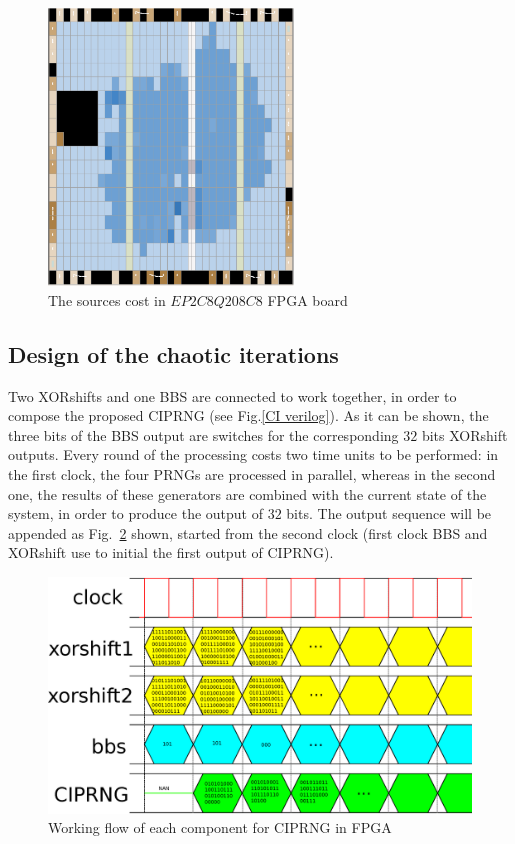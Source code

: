 \begin{figure}
\begin{center}
  \includegraphics[width=6.5cm]{print.eps}
\end{center}
\caption{The sources cost in $EP2C8Q208C8$ FPGA board}
 \label{logic elements}
\end{figure}

\subsection{Design of the chaotic iterations}
Two XORshifts and one BBS are connected to work together, in order to compose the
proposed CIPRNG (see Fig.\ref{CI verilog}). 
As it can be shown, the three bits of the BBS output are switches for the corresponding $32$ bits XORshift outputs. Every round of the 
 processing costs two time units
 to be performed: in the first clock, 
the four PRNGs are processed in parallel,
whereas in the second one, the results of these generators are combined with 
the current state of the system, in order to produce the output of $32$ bits. The output sequence will be appended as Fig.~\ref{ci_OUTPUT} shown, started from the second clock (first clock BBS and XORshift use to initial the first output of CIPRNG).

\begin{figure}
\begin{center}
  \includegraphics[width=14cm]{ci_OUTPUT.eps}
\end{center}
\caption{Working flow of each component for CIPRNG in FPGA}
 \label{ci_OUTPUT}
\end{figure}

